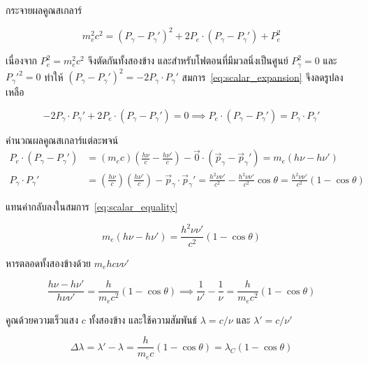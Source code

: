 กระจายผลคูณสเกลาร์

\begin{equation}
m_e^2 c^2 = (P_\gamma - P_\gamma')^2 + 2 P_e \cdot (P_\gamma - P_\gamma') + P_e^2
\label{eq:scalar_expansion}
\end{equation}

เนื่องจาก $P_e^2 = m_e^2 c^2$ จึงตัดกันทั้งสองข้าง และสำหรับโฟตอนที่มีมวลนิ่งเป็นศูนย์ $P_\gamma^2 = 0$ และ $P_\gamma'^2 = 0$ ทำให้ $(P_\gamma - P_\gamma')^2 = -2 P_\gamma \cdot P_\gamma'$ สมการ~\eqref{eq:scalar_expansion} จึงลดรูปลงเหลือ

\begin{equation}
-2 P_\gamma \cdot P_\gamma' + 2 P_e \cdot (P_\gamma - P_\gamma') = 0 \implies P_e \cdot (P_\gamma - P_\gamma') = P_\gamma \cdot P_\gamma'
\label{eq:scalar_equality}
\end{equation}

คำนวณผลคูณสเกลาร์แต่ละพจน์
\begin{align}
P_e \cdot (P_\gamma - P_\gamma') &= (m_e c)\left( \frac{h\nu}{c} - \frac{h\nu'}{c} \right) - \vec{0}\cdot(\vec{p}_\gamma - \vec{p}_\gamma') = m_e (h\nu - h\nu') \\
P_\gamma \cdot P_\gamma' &= \left( \frac{h\nu}{c} \right)\left( \frac{h\nu'}{c} \right) - \vec{p}_\gamma \cdot \vec{p}_\gamma' = \frac{h^2 \nu\nu'}{c^2} - \frac{h^2 \nu\nu'}{c^2}\cos\theta = \frac{h^2 \nu\nu'}{c^2}(1 - \cos\theta)
\end{align}

แทนค่ากลับลงในสมการ~\eqref{eq:scalar_equality}

\begin{equation}
m_e (h\nu - h\nu') = \frac{h^2 \nu\nu'}{c^2}(1 - \cos\theta)
\end{equation}

หารตลอดทั้งสองข้างด้วย $m_e h c \nu \nu'$

\begin{equation}
\frac{h\nu - h\nu'}{h\nu\nu'} = \frac{h}{m_e c^2}(1 - \cos\theta) \implies \frac{1}{\nu'} - \frac{1}{\nu} = \frac{h}{m_e c^2}(1 - \cos\theta)
\end{equation}

คูณด้วยความเร็วแสง $c$ ทั้งสองข้าง และใช้ความสัมพันธ์ $\lambda = c/\nu$ และ $\lambda' = c/\nu'$

\begin{equation}
\Delta\lambda = \lambda' - \lambda = \frac{h}{m_e c}(1 - \cos\theta) = \lambda_C (1 - \cos\theta)
\label{eq:compton_formula_master}
\end{equation}

